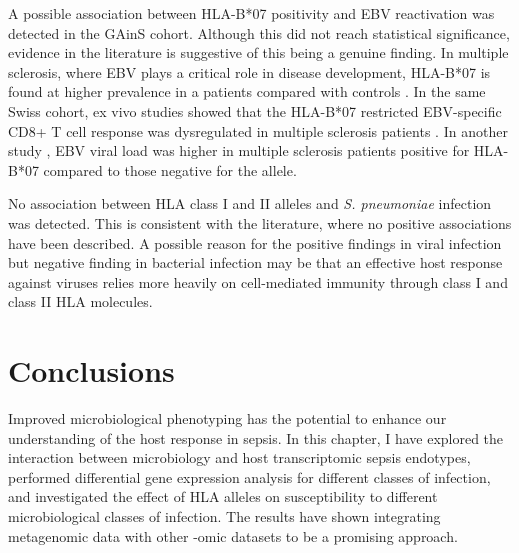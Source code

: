 A possible association between HLA-B*07 positivity and EBV reactivation was detected in the GAinS cohort. Although this did not reach statistical significance, evidence in the literature is suggestive of this being a genuine finding. In multiple sclerosis, where EBV plays a critical role in disease development, HLA-B*07 is found at higher prevalence in a patients compared with controls \parencite{Jilek2012}. In the same Swiss cohort, ex vivo studies showed that the HLA-B*07 restricted EBV-specific CD8+ T cell response was dysregulated in multiple sclerosis patients \parencite{Jilek2012}. In another study \parencite{Agostini2018}, EBV viral load was higher in multiple sclerosis patients positive for HLA-B*07 compared to those negative for the allele.

No association between HLA class I and II alleles and \textit{S. pneumoniae} infection was detected. This is consistent with the literature, where no positive associations have been described. A possible reason for the positive findings in viral infection but negative finding in bacterial infection may be that an effective host response against viruses relies more heavily on cell-mediated immunity through class I and class II HLA molecules. 
 
\section{Conclusions}
Improved microbiological phenotyping has the potential to enhance our understanding of the host response in sepsis. In this chapter, I have explored the interaction between microbiology and host transcriptomic sepsis endotypes, performed differential gene expression analysis for different classes of infection, and investigated the effect of HLA alleles on susceptibility to different microbiological classes of infection. The results have shown integrating metagenomic data with other -omic datasets to be a promising approach. 
